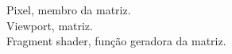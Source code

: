 \documentclass[preview]{standalone}
\begin{document}
Pixel, membro da matriz.\\Viewport, matriz.\\Fragment shader, função geradora da matriz.\\
\end{document}
